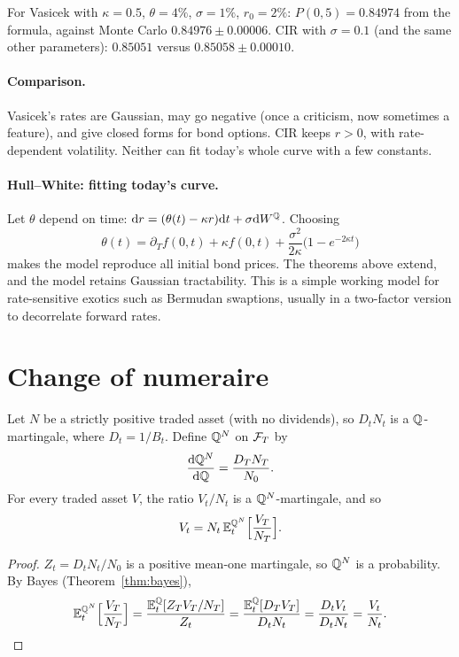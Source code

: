 \begin{numcheck}
For Vasicek with $\kappa=0.5$, $\theta=4\%$, $\sigma=1\%$, $r_0=2\%$: $P(0,5)=0.84974$ from the formula, against Monte Carlo $0.84976\pm0.00006$. CIR with $\sigma=0.1$ (and the same other parameters): $0.85051$ versus $0.85058\pm0.00010$.
\end{numcheck}

\paragraph{Comparison.} Vasicek's rates are Gaussian, may go negative (once a criticism, now sometimes a feature), and give closed forms for bond options. CIR keeps $r>0$, with rate-dependent volatility. Neither can fit today's whole curve with a few constants.

\paragraph{Hull--White: fitting today's curve.} Let $\theta$ depend on time: $\mathrm{d} r=(\theta(t)-\kappa r)\mathrm{d} t+\sigma\mathrm{d} W^{\mathbb{Q}}$. Choosing
\[
\theta(t)=\partial_Tf(0,t)+\kappa f(0,t)+\frac{\sigma^2}{2\kappa}\bigl(1-e^{-2\kappa t}\bigr)
\]
makes the model reproduce all initial bond prices. The theorems above extend, and the model retains Gaussian tractability. This is a simple working model for rate-sensitive exotics such as Bermudan swaptions, usually in a two-factor version to decorrelate forward rates.

\section{Change of numeraire}\label{sec:numeraire}

\begin{theorem}\label{thm:numeraire}
Let $N$ be a strictly positive traded asset (with no dividends), so $D_tN_t$ is a $\mathbb{Q}$-martingale, where $D_t=1/B_t$. Define $\mathbb{Q}^N$ on $\mathcal{F}_T$ by
\[
\frac{\mathrm{d}\mathbb{Q}^N}{\mathrm{d}\mathbb{Q}}=\frac{D_TN_T}{N_0}.
\]
For every traded asset $V$, the ratio $V_t/N_t$ is a $\mathbb{Q}^N$-martingale, and so
\[
V_t=N_t\,\mathbb{E}^{\mathbb{Q}^N}_t\Bigl[\frac{V_T}{N_T}\Bigr].
\]
\end{theorem}
\begin{proof}
$Z_t=D_tN_t/N_0$ is a positive mean-one martingale, so $\mathbb{Q}^N$ is a probability. By Bayes (Theorem~\ref{thm:bayes}),
\[
\mathbb{E}^{\mathbb{Q}^N}_t\Bigl[\frac{V_T}{N_T}\Bigr]=\frac{\mathbb{E}^{\mathbb{Q}}_t[Z_TV_T/N_T]}{Z_t}=\frac{\mathbb{E}^{\mathbb{Q}}_t[D_TV_T]}{D_tN_t}=\frac{D_tV_t}{D_tN_t}=\frac{V_t}{N_t}.\qedhere
\]
\end{proof}

